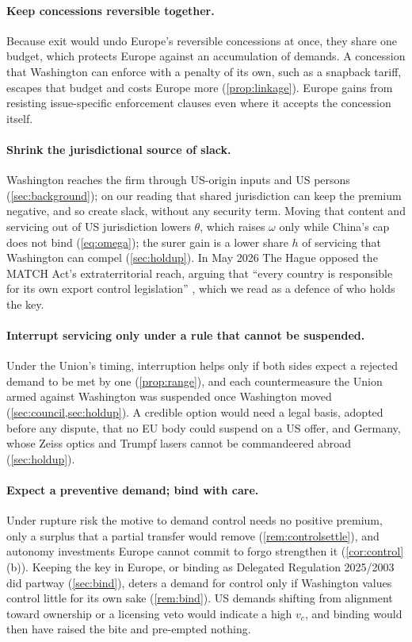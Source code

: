 \paragraph{Keep concessions reversible together.} Because exit would undo Europe's reversible concessions at once, they share one budget, which protects Europe against an accumulation of demands. A concession that Washington can enforce with a penalty of its own, such as a snapback tariff, escapes that budget and costs Europe more (\cref{prop:linkage}). Europe gains from resisting issue-specific enforcement clauses even where it accepts the concession itself.

\paragraph{Shrink the jurisdictional source of slack.} Washington reaches the firm through US-origin inputs and US persons (\cref{sec:background}); on our reading that shared jurisdiction can keep the premium negative, and so create slack, without any security term. Moving that content and servicing out of US jurisdiction lowers $\theta$, which raises $\omega$ only while China's cap does not bind (\cref{eq:omega}); the surer gain is a lower share $h$ of servicing that Washington can compel (\cref{sec:holdup}). In May 2026 The Hague opposed the MATCH Act's extraterritorial reach, arguing that ``every country is responsible for its own export control legislation'' \citep[our translation]{tk2026match}, which we read as a defence of who holds the key.

\paragraph{Interrupt servicing only under a rule that cannot be suspended.} Under the Union's timing, interruption helps only if both sides expect a rejected demand to be met by one (\cref{prop:range}), and each countermeasure the Union armed against Washington was suspended once Washington moved (\cref{sec:council,sec:holdup}). A credible option would need a legal basis, adopted before any dispute, that no EU body could suspend on a US offer, and Germany, whose Zeiss optics and Trumpf lasers cannot be commandeered abroad (\cref{sec:holdup}).

\paragraph{Expect a preventive demand; bind with care.} Under rupture risk the motive to demand control needs no positive premium, only a surplus that a partial transfer would remove (\cref{rem:controlsettle}), and autonomy investments Europe cannot commit to forgo strengthen it (\cref{cor:control}(b)). Keeping the key in Europe, or binding as Delegated Regulation 2025/2003 \citep{eu2025dualuse} did partway (\cref{sec:bind}), deters a demand for control only if Washington values control little for its own sake (\cref{rem:bind}). US demands shifting from alignment toward ownership or a licensing veto would indicate a high $v_c$, and binding would then have raised the bite and pre-empted nothing.


